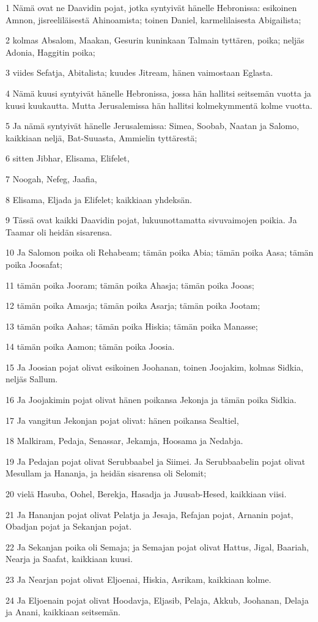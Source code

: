 \par 1 Nämä ovat ne Daavidin pojat, jotka syntyivät hänelle Hebronissa: esikoinen Amnon, jisreeliläisestä Ahinoamista; toinen Daniel, karmelilaisesta Abigailista;
\par 2 kolmas Absalom, Maakan, Gesurin kuninkaan Talmain tyttären, poika; neljäs Adonia, Haggitin poika;
\par 3 viides Sefatja, Abitalista; kuudes Jitream, hänen vaimostaan Eglasta.
\par 4 Nämä kuusi syntyivät hänelle Hebronissa, jossa hän hallitsi seitsemän vuotta ja kuusi kuukautta. Mutta Jerusalemissa hän hallitsi kolmekymmentä kolme vuotta.
\par 5 Ja nämä syntyivät hänelle Jerusalemissa: Simea, Soobab, Naatan ja Salomo, kaikkiaan neljä, Bat-Suuasta, Ammielin tyttärestä;
\par 6 sitten Jibhar, Elisama, Elifelet,
\par 7 Noogah, Nefeg, Jaafia,
\par 8 Elisama, Eljada ja Elifelet; kaikkiaan yhdeksän.
\par 9 Tässä ovat kaikki Daavidin pojat, lukuunottamatta sivuvaimojen poikia. Ja Taamar oli heidän sisarensa.
\par 10 Ja Salomon poika oli Rehabeam; tämän poika Abia; tämän poika Aasa; tämän poika Joosafat;
\par 11 tämän poika Jooram; tämän poika Ahasja; tämän poika Jooas;
\par 12 tämän poika Amasja; tämän poika Asarja; tämän poika Jootam;
\par 13 tämän poika Aahas; tämän poika Hiskia; tämän poika Manasse;
\par 14 tämän poika Aamon; tämän poika Joosia.
\par 15 Ja Joosian pojat olivat esikoinen Joohanan, toinen Joojakim, kolmas Sidkia, neljäs Sallum.
\par 16 Ja Joojakimin pojat olivat hänen poikansa Jekonja ja tämän poika Sidkia.
\par 17 Ja vangitun Jekonjan pojat olivat: hänen poikansa Sealtiel,
\par 18 Malkiram, Pedaja, Senassar, Jekamja, Hoosama ja Nedabja.
\par 19 Ja Pedajan pojat olivat Serubbaabel ja Siimei. Ja Serubbaabelin pojat olivat Mesullam ja Hananja, ja heidän sisarensa oli Selomit;
\par 20 vielä Hasuba, Oohel, Berekja, Hasadja ja Juusab-Hesed, kaikkiaan viisi.
\par 21 Ja Hananjan pojat olivat Pelatja ja Jesaja, Refajan pojat, Arnanin pojat, Obadjan pojat ja Sekanjan pojat.
\par 22 Ja Sekanjan poika oli Semaja; ja Semajan pojat olivat Hattus, Jigal, Baariah, Nearja ja Saafat, kaikkiaan kuusi.
\par 23 Ja Nearjan pojat olivat Eljoenai, Hiskia, Asrikam, kaikkiaan kolme.
\par 24 Ja Eljoenain pojat olivat Hoodavja, Eljasib, Pelaja, Akkub, Joohanan, Delaja ja Anani, kaikkiaan seitsemän.

